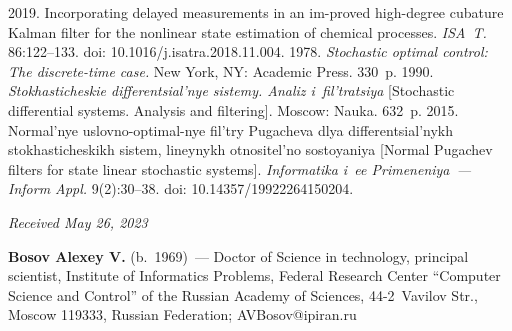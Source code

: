 \begin{multicols}{2}
{{\begin{thebibliography}{99}
       2019. Incorporating delayed 
measurements in an im-proved high-degree cubature Kalman filter for the nonlinear state estimation of 
chemical processes. \textit{ISA~T.} 86:122--133. doi: 10.1016/j.isatra.2018.11.004.
       1978. \textit{Stochastic optimal control: The 
discrete-time case.} New York, NY: Academic Press. 330~p.
       1990. \textit{Sto\-kha\-sti\-che\-skie 
 dif\-fe\-ren\-tsi\-al'\-nye sis\-te\-my. Ana\-liz i~fil't\-ra\-tsiya} [Stochastic differential systems. Analysis 
and filtering]. Moscow: Nauka. 632~p.
       2015. Nor\-mal'\-nye uslovno-optimal-nye fil't\-ry 
Pu\-ga\-che\-va dlya dif\-fe\-ren\-tsi\-al'\-nykh sto\-kha\-sti\-che\-skikh sis\-tem, li\-ney\-nykh  
ot\-no\-si\-tel'\-no so\-sto\-yaniya [Normal Pugachev filters for state linear stochastic systems]. 
\textit{Informatika i~ee Primeneniya~--- Inform Appl.} 9(2):30--38. doi: 10.14357/19922264150204.

\end{thebibliography}

 }
 }

\end{multicols}

\vspace*{-6pt}

\hfill{\small\textit{Received May 26, 2023}} 

\vspace*{-20pt}
      
      \Contrl
      
      \noindent
      \textbf{Bosov Alexey V.} (b.\ 1969)~--- Doctor of Science in technology, principal scientist, 
Institute of Informatics Problems, Federal Research Center ``Computer Science and Control'' of the 
Russian Academy of Sciences, 44-2~Vavilov Str., Moscow 119333, Russian Federation; 
\mbox{AVBosov@ipiran.ru}
      
      


\label{end\stat}

\renewcommand{\bibname}{\protect\rm Литература} 